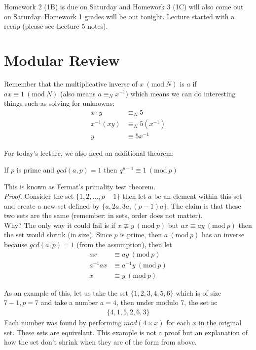 \documentclass[14pt]{extarticle}
\newcommand{\Mod}[1]{\ (\mathrm{mod}\ #1)}
\begin{document}
	\MakeScribeTop
    
    Homework 2 (1B) is due on Saturday and Homework 3 (1C) will also come out
    on Saturday. Homework 1 grades will be out tonight. Lecture started with
    a recap (please see Lecture 5 notes).

    \section*{Modular Review}
    Remember that the multiplicative inverse of $x\Mod{N}$ is $a$ if
    $ax\equiv 1\Mod{N}$ (also means $a\equiv_N x^{-1}$) which means we can
    do interesting things such as solving for unknowns:
    \begin{align*}
        x\cdot y&\equiv_N 5             \\
        x^{-1} (xy)&\equiv_N 5(x^{-1})  \\
        y&\equiv 5x^{-1}
    \end{align*}

    For today's lecture, we also need an additional theorem:
    \begin{theorem*}
        If $p$ is prime and $gcd(a, p) = 1$ then $q^{p - 1} \equiv 1
        \Mod{p}$
    \end{theorem*}
    This is known as Fermat's primality test theorem.\\
    
    \textit{Proof.} Consider the set $\{1, 2, \ldots, p - 1\}$ then let
    $a$ be an element within this set and create a new set defined by
    $\{a, 2a, 3a, (p-1)a\}$. The claim is that these two sets are the same
    (remember: in sets, order does not matter).\\

    Why? The only way it could fail is if $x\not\equiv y\Mod{p}$ but
    $ax\equiv ay\Mod{p}$ then the set would shrink (in size). Since $p$
    is prime, then $a\Mod{p}$ has an inverse because $gcd(a, p) = 1$ (from
    the assumption), then let
    \begin{align*}
        ax &\equiv ay\Mod{p}                 \\
        a^{-1}ax &\equiv a^{-1} y\Mod{p}     \\
        x&\equiv y\Mod{p}    
    \end{align*}

    As an example of this, let us take the set $\{1, 2, 3, 4, 5, 6\}$ which
    is of size $7 - 1, p = 7$ and take a number $a = 4$, then under modulo
    $7$, the set is:
    \begin{align*}
        \{4, 1, 5, 2, 6, 3\}
    \end{align*}
    Each number was found by performing $mod(4\times x)$ for each $x$
    in the original set. These sets are equivelant. This example is not a proof
    but an explanation of how the set don't shrink when they are of the form
    from above.\\
\end{document}
